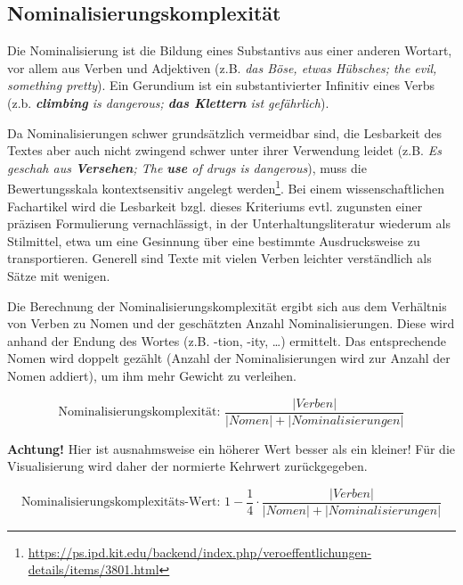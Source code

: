 \documentclass[10pt,a4paper]{article}
\begin{document}
	\subsection*{Nominalisierungskomplexität}
	Die Nominalisierung ist die Bildung eines Substantivs aus einer anderen Wortart, vor allem aus Verben und Adjektiven (z.B. \textit{das Böse, etwas Hübsches; the evil, something pretty}). Ein Gerundium ist ein substantivierter Infinitiv eines Verbs (z.b. \textit{\textbf{climbing} is dangerous; \textbf{das Klettern} ist gefährlich}).
	
	Da Nominalisierungen schwer grundsätzlich vermeidbar sind, die Lesbarkeit des Textes aber auch nicht zwingend schwer unter ihrer Verwendung leidet (z.B. \textit{Es geschah aus \textbf{Versehen}; The \textbf{use} of drugs is dangerous}), muss die Bewertungsskala kontextsensitiv angelegt werden\footnote{\url{https://ps.ipd.kit.edu/backend/index.php/veroeffentlichungen-details/items/3801.html}}. Bei einem wissenschaftlichen Fachartikel wird die Lesbarkeit bzgl. dieses Kriteriums evtl. zugunsten einer präzisen Formulierung vernachlässigt, in der Unterhaltungsliteratur wiederum als Stilmittel, etwa um eine Gesinnung über eine bestimmte Ausdrucksweise zu transportieren. Generell sind Texte mit vielen Verben leichter verständlich als Sätze mit wenigen.
	
	Die Berechnung der Nominalisierungskomplexität ergibt sich aus dem Verhältnis von Verben zu Nomen und der geschätzten Anzahl Nominalisierungen. Diese wird anhand der Endung des Wortes (z.B. -tion, -ity, \dots) ermittelt. Das entsprechende Nomen wird doppelt gezählt (Anzahl der Nominalisierungen wird zur Anzahl der Nomen addiert), um ihm mehr Gewicht zu verleihen.
	
	\begin{equation*}
		\text{Nominalisierungskomplexität: }\frac{|Verben|}{|Nomen|+|Nominalisierungen|}
	\end{equation*}
	
	\textbf{Achtung!} Hier ist ausnahmsweise ein höherer Wert besser als ein kleiner! Für die Visualisierung wird daher der normierte Kehrwert zurückgegeben.
	
	\begin{equation*}
	\text{Nominalisierungskomplexitäts-Wert: } 1-\frac{1}{4}\cdot\frac{|Verben|}{|Nomen|+|Nominalisierungen|}
	\end{equation*}
		
	
\end{document}
